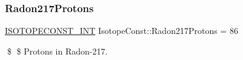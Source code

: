 \subsubsection{\texorpdfstring{Radon217\+Protons}{Radon217Protons}}
{\footnotesize\ttfamily \mbox{\hyperlink{group___isotope_const-_macros_ga5f18360b3e99483a35c32d789e62621c}{I\+S\+O\+T\+O\+P\+E\+C\+O\+N\+S\+T\+\_\+\+I\+NT}} Isotope\+Const\+::\+Radon217\+Protons = 86}

\$ \$ Protons in Radon-\/217. 